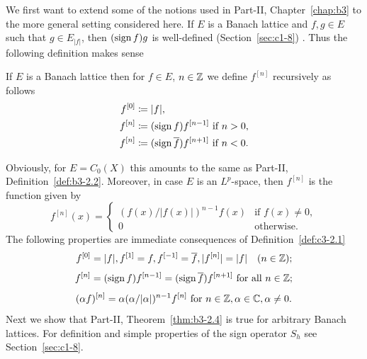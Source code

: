 We first want to extend some of the notions used in Part-II, Chapter~\ref{chap:b3} to the more general setting considered here.
If\/ $E$ is a Banach lattice and $f,g \in E$ such that $g \in E_{|f|}$, then $(\operatorname{sign}  f)g$ is well-defined (\cf Section~\ref{sec:c1-8})%
.
Thus the following definition makes sense
\begin{definition}\label{def:c3-2.1}
	If\/ $E$ is a Banach lattice then for $f \in E$, $n \in \mathbb{Z}$ we define $f^{[n]}$ recursively as follows
	\begin{equation}\label{eq:c3-2.1}
	\begin{split}
		f^{[0]} &\coloneq |f| ,  \\
		f^{[n]} &\coloneq (\operatorname{sign}  f)f^{[n-1]} \text{ if } n > 0 , \\
		f^{[n]} &\coloneq (\operatorname{sign}  \overline{f})f^{[n+1]} \text{ if } n < 0 .
	\end{split}
	\end{equation}
\end{definition}
Obviously, for $E = C_{0}(X)$ this amounts to the same as Part-II, Definition~\ref{def:b3-2.2}.
Moreover, in case $E$ is an $L^p$-space, then $f^{[n]}$ is the function given by
\begin{equation}\label{eq:c3-2.2}
	f^{[n]}(x) = \begin{cases}
		(f(x)/|f(x)|)^{n-1}f(x) & \text{if } f(x) \neq 0 ,  \\
		0 & \text{otherwise}.
	\end{cases}
\end{equation}
The following properties are immediate consequences of Definition~\ref{def:c3-2.1}
\begin{equation}\label{eq:c3-2.3}
	f^{[0]} = |f|, f^{[1]} = f, f^{[-1]} = \overline{f}, |f^{[n]}| = |f| \quad (n \in \mathbb{Z});
\end{equation}
\begin{equation}\label{eq:c3-2.4}
	f^{[n]} = (\operatorname{sign}  f)f^{[n-1]} = (\operatorname{sign}  \overline{f})f^{[n+1]} \text{ for all } n \in \mathbb{Z};
\end{equation}
\begin{equation}\label{eq:c3-2.5}
	(\alpha f)^{[n]} = \alpha(\alpha/|\alpha|)^{n-1}f^{[n]} \text{ for } n \in \mathbb{Z}, \alpha \in \mathbb{C} , \alpha \neq 0.
\end{equation}
Next we show that Part-II, Theorem~\ref{thm:b3-2.4} is true for arbitrary Banach lattices.
For definition and simple properties of the sign operator $S_{h}$ see Section~\ref{sec:c1-8}.

